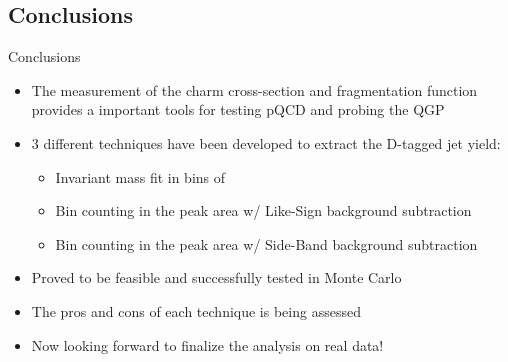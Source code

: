 \documentclass{beamer}
\begin{document}
\subsection*{Conclusions}
\begin{frame}{Conclusions}
\begin{itemize}
\item The measurement of the charm cross-section and fragmentation function provides a important tools for
testing pQCD and probing the QGP
\item 3 different techniques have been developed to extract the D-tagged jet yield:
\begin{itemize}
\item Invariant mass fit in bins of \ptjet
\item Bin counting in the peak area w/ Like-Sign background subtraction
\item Bin counting in the peak area w/ Side-Band background subtraction
\end{itemize}
\item Proved to be feasible and successfully tested in Monte Carlo
\item The pros and cons of each technique is being assessed
\item Now looking forward to finalize the analysis on real data!
\end{itemize}
\end{frame}
\end{document}
